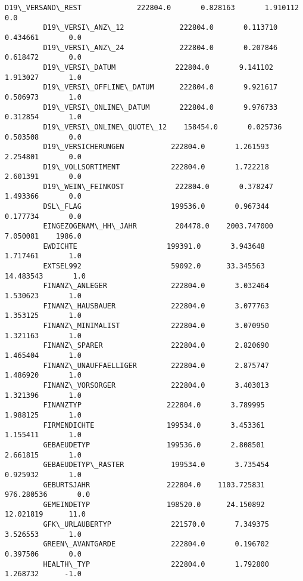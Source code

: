 \documentclass[11pt]{article}
\begin{document}
\begin{Verbatim}[commandchars=\\\{\}]
         D19\_VERSAND\_REST             222804.0       0.828163       1.910112       0.0   
         D19\_VERSI\_ANZ\_12             222804.0       0.113710       0.434661       0.0   
         D19\_VERSI\_ANZ\_24             222804.0       0.207846       0.618472       0.0   
         D19\_VERSI\_DATUM              222804.0       9.141102       1.913027       1.0   
         D19\_VERSI\_OFFLINE\_DATUM      222804.0       9.921617       0.506973       1.0   
         D19\_VERSI\_ONLINE\_DATUM       222804.0       9.976733       0.312854       1.0   
         D19\_VERSI\_ONLINE\_QUOTE\_12    158454.0       0.025736       0.503508       0.0   
         D19\_VERSICHERUNGEN           222804.0       1.261593       2.254801       0.0   
         D19\_VOLLSORTIMENT            222804.0       1.722218       2.601391       0.0   
         D19\_WEIN\_FEINKOST            222804.0       0.378247       1.493366       0.0   
         DSL\_FLAG                     199536.0       0.967344       0.177734       0.0   
         EINGEZOGENAM\_HH\_JAHR         204478.0    2003.747000       7.050081    1986.0   
         EWDICHTE                     199391.0       3.943648       1.717461       1.0   
         EXTSEL992                     59092.0      33.345563      14.483543       1.0   
         FINANZ\_ANLEGER               222804.0       3.032464       1.530623       1.0   
         FINANZ\_HAUSBAUER             222804.0       3.077763       1.353125       1.0   
         FINANZ\_MINIMALIST            222804.0       3.070950       1.321163       1.0   
         FINANZ\_SPARER                222804.0       2.820690       1.465404       1.0   
         FINANZ\_UNAUFFAELLIGER        222804.0       2.875747       1.486920       1.0   
         FINANZ\_VORSORGER             222804.0       3.403013       1.321396       1.0   
         FINANZTYP                    222804.0       3.789995       1.988125       1.0   
         FIRMENDICHTE                 199534.0       3.453361       1.155411       1.0   
         GEBAEUDETYP                  199536.0       2.808501       2.661815       1.0   
         GEBAEUDETYP\_RASTER           199534.0       3.735454       0.925932       1.0   
         GEBURTSJAHR                  222804.0    1103.725831     976.280536       0.0   
         GEMEINDETYP                  198520.0      24.150892      12.021819      11.0   
         GFK\_URLAUBERTYP              221570.0       7.349375       3.526553       1.0   
         GREEN\_AVANTGARDE             222804.0       0.196702       0.397506       0.0   
         HEALTH\_TYP                   222804.0       1.792800       1.268732      -1.0   

\end{Verbatim}
\end{document}
